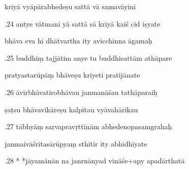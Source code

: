 \documentclass[article,12pt,a4paper]{memoir}%
\newcounter{parCount}
\begin{document}
	  
	  \pstart \leavevmode%
	kriyā vyāpārabhedeṣu sattā vā samavāyinī 
	{}
	\pend%
      

	  
	  \pstart {}.24 antye vātmani yā sattā sā kriyā kaiś cid iṣyate 
	{}
	\pend%
      

	  
	  \pstart \leavevmode%
	bhāva eva hi dhātvartha ity avicchinna āgamaḥ 
	{}
	\pend%
      

	  
	  \pstart {}.25 buddhiṃ tajjātim anye tu buddhisattām athāpare 
	{}
	\pend%
      

	  
	  \pstart \leavevmode%
	pratyastarūpāṃ bhāveṣu kriyeti pratijānate 
	{}
	\pend%
      

	  
	  \pstart {}.26 āvirbhāvatirobhāvau janmanāśau tathāparaiḥ 
	{}
	\pend%
      

	  
	  \pstart \leavevmode%
	ṣaṭsu bhāvavikāreṣu kalpitau vyāvahārikau 
	{}
	\pend%
      

	  
	  \pstart {}.27 tābhyāṃ sarvapravṛttīnām abhedenopasamgrahaḥ 
	{}
	\pend%
      

	  
	  \pstart \leavevmode%
	janmaivāśritasārūpyaṃ sthitir ity abhidhīyate 
	{}
	\pend%
      

	  
	  \pstart {}.28 * *jāyamānān na janrnānyad vināśe+apy apadārthatā 
	{}
	\pend%
      
\end{document}
